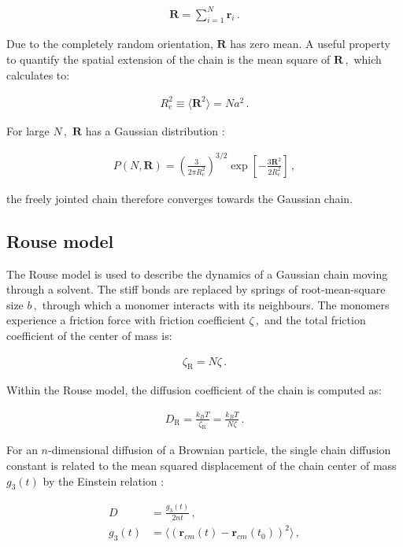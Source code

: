 \documentclass[bachelor,       %
               twoside,        %
               BCOR10mm,       %
               ngerman, english %
               ]{GAUBM}
\begin{document}
\begin{align}
    \mathbf R=\sum_{i=1}^{N}\mathbf r_i\,.
\end{align}

Due to the completely random orientation, $\mathbf R$ has zero mean. A useful property to quantify the spatial extension of the chain is the mean square of $\mathbf R\,,$ which calculates to:

\begin{align}
    R_e^2\equiv \langle\mathbf R^2\rangle=Na^2\,.
\end{align}

For large $N\,,$ $\mathbf R$ has a Gaussian distribution \cite{Rubin03}:
 
 
\begin{align}
    P(N,\mathbf R)=\left(\frac{3}{2\pi R_e^2}\right)^{3/2}\exp\left[-\frac{3\mathbf R^2}{2R_e^2}\right]\,,
\end{align}
 
 the freely jointed chain therefore converges towards the Gaussian chain. 
 
\subsection{Rouse model}

The Rouse model \cite{Rouse} is used to describe the dynamics of a Gaussian chain moving through a solvent. The stiff bonds are replaced by springs of root-mean-square size $b\,,$ through which a monomer interacts with its neighbours. The monomers experience a friction force with friction coefficient  $\zeta\,,$ and the total friction coefficient of the center of mass is:

\begin{align}
    \zeta_\mathrm R=N\zeta\,.
\end{align}

Within the Rouse model, the diffusion coefficient of the chain is computed as:

\begin{align}
    D_\mathrm R=\frac{k_BT}{\zeta_\mathrm R}=\frac{k_BT}{N\zeta}\,.
    \label{eq:d_rouse}
\end{align}

For an $n$-dimensional diffusion of a Brownian particle, the single chain diffusion constant is related to the mean squared displacement of the chain center of mass $g_3(t)$ by the Einstein relation \cite{einstein_1905}:

\begin{align}
    D&=\frac{g_3(t)}{2nt}\,,\\
    g_3(t)&=\langle (\mathbf r_{cm}(t)-\mathbf r_{cm}(t_0))^2\rangle\,,\nonumber
    \label{eq:einstein_relation}
\end{align}
\end{document}
